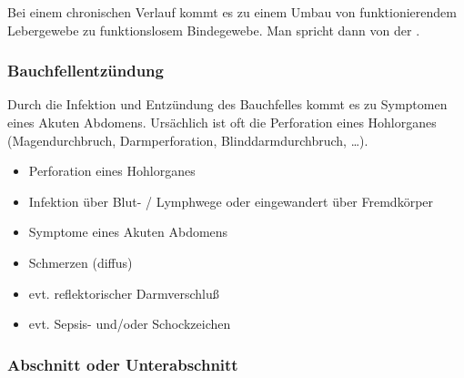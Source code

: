 Bei einem chronischen
Verlauf kommt es zu einem Umbau von
funktionierendem Lebergewebe zu
funktionslosem Bindegewebe. Man spricht
dann von der
\label{topic-leberzirrhose}.




\subsubsection{Bauchfellentzündung}



\gMarried
{Durch die Infektion und Entzündung des Bauchfelles kommt es
zu Symptomen eines Akuten Abdomens. Ursächlich ist oft die Perforation eines Hohlorganes  (Magendurchbruch,
Darmperforation, Blinddarmdurchbruch, \ldots). 
} {

\begin{itemize}
\item Perforation eines Hohlorganes
\item Infektion \"uber Blut- / Lymphwege oder eingewandert
über Fremdkörper
\end{itemize}


\begin{itemize}
\item Symptome eines Akuten Abdomens
\item Schmerzen (diffus)
\item evt. reflektorischer Darmverschluß
\item evt. Sepsis- und/oder Schockzeichen
\end{itemize}}







\subsubsection{Abschnitt oder Unterabschnitt}

